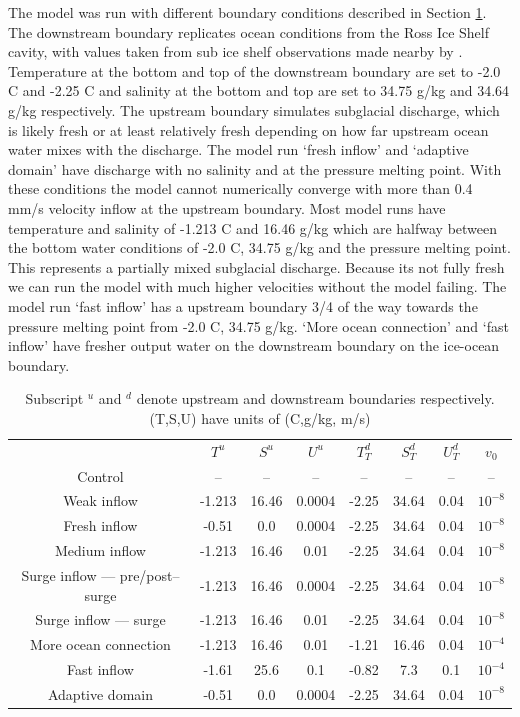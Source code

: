 The model was run with different boundary conditions described in Section \ref{tab:model_runs}. The downstream boundary replicates ocean conditions from the Ross Ice Shelf cavity, with values taken from sub ice shelf observations made nearby by \citep{robinson2020ice}. 
Temperature at the bottom and top of the downstream boundary are set to -2.0 \textdegree C and -2.25 \textdegree C and salinity at the bottom and top are set to 34.75 g/kg and 34.64 g/kg respectively. 
The upstream boundary simulates subglacial discharge, which is likely fresh or at least relatively fresh depending on how far upstream ocean water mixes with the discharge. The model run `fresh inflow' and `adaptive domain' have discharge with no salinity and at the pressure melting point. With these conditions the model cannot numerically converge with more than 0.4 mm/s velocity inflow at the upstream boundary. Most model runs have temperature and salinity of -1.213 \textdegree C and 16.46 g/kg which are halfway between the bottom water conditions of -2.0 \textdegree C, 34.75 g/kg and the pressure melting point. This represents a partially mixed subglacial discharge. Because its not fully fresh we can run the model with much higher velocities without the model failing. The model run `fast inflow' has a upstream boundary 3/4 of the way towards the pressure melting point from -2.0 \textdegree C, 34.75 g/kg. `More ocean connection' and `fast inflow' have fresher output water on the downstream boundary on the ice-ocean boundary. 
\begin{table}
\begin{tabular}{c|c|c|c|c|c|c|c}
    & $T^{u}$ & $S^{u} $ & $U^{u}$& $T^d_T$ & $S^d_T$ & $U^d_T$ & $v_0$ \\
    Control & -- & -- & --& -- &--  &--  &--  \\
    Weak inflow & -1.213 & 16.46  &0.0004 &  -2.25 & 34.64 & 0.04 & $10^{-8}$  \\
    Fresh inflow & -0.51 & 0.0 &0.0004 &  -2.25 & 34.64 & 0.04 & $10^{-8}$  \\
    Medium inflow & -1.213 & 16.46 & 0.01 &  -2.25 & 34.64 & 0.04  & $10^{-8}$ \\
    Surge inflow --- pre/post--surge  & -1.213 & 16.46  &0.0004 &  -2.25 & 34.64 & 0.04 & $10^{-8}$ \\
    Surge inflow --- surge & -1.213 & 16.46 & 0.01 &  -2.25 & 34.64 & 0.04  & $10^{-8}$ \\
    More ocean connection & -1.213 & 16.46 & 0.01 &  -1.21 & 16.46 & 0.04& $10^{-4}$  \\
    Fast inflow & -1.61 & 25.6 & 0.1 & -0.82 & 7.3  & 0.1 & $10^{-4}$ \\
    Adaptive domain  & -0.51 & 0.0 &0.0004 &  -2.25 & 34.64 & 0.04 & $10^{-8}$ 


\end{tabular}
\caption[]{\label{tab:model_runs} Subscript $^u$ and $^d$ denote upstream and downstream boundaries respectively. (T,S,U) have units of (\textdegree C,g/kg, m/s)  }
\end{table}

